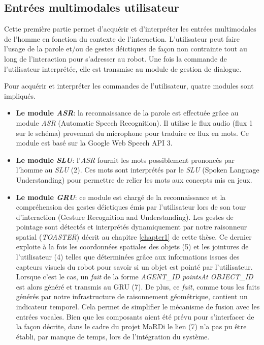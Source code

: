 \documentclass[a4paper,11pt,twoside]{StyleThese}
\begin{document}
\subsection{Entrées multimodales utilisateur}
\label{sec:entréesDial}
Cette première partie permet d'acquérir et d'interpréter les entrées multimodales de l'homme en fonction du contexte de l'interaction. L’utilisateur peut faire l’usage de la parole et/ou de gestes déictiques de façon non contrainte tout au long de l’interaction pour s’adresser au robot. Une fois la commande de l'utilisateur interprétée, elle est transmise au module de gestion de dialogue. 

Pour acquérir et interpréter les commandes de l'utilisateur, quatre modules sont impliqués.

\begin{itemize}
\item \textbf{Le module \textit{ASR}}: la reconnaissance de la parole est effectuée grâce au module \textit{ASR} (Automatic Speech Recognition). Il utilise le flux audio (flux 1 sur le schéma) provenant du microphone pour traduire ce flux en mots. Ce module est basé sur la Google Web Speech API 3.

\item \textbf{Le module \textit{SLU}}: l'\textit{ASR} fournit les mots possiblement prononcés par l'homme au \textit{SLU} (2). Ces mots sont interprétés par le \textit{SLU} (Spoken Language Understanding) pour permettre de relier les mots aux concepts mis en jeux.

\item \textbf{Le module \textit{GRU}}: ce module est chargé de la reconnaissance et la compréhension des gestes déictiques émis par l’utilisateur lors de son tour d’interaction (Gesture Recognition and Understanding). Les gestes de pointage sont détectés et interprétés dynamiquement par notre raisonneur spatial (\textit{TOASTER}) décrit au chapitre \ref{chapter1} de cette thèse. Ce dernier exploite à la fois les coordonnées spatiales des objets (5) et les jointures de l’utilisateur (4) telles que déterminées grâce aux informations issues des capteurs visuels du robot pour savoir si un objet est pointé par l’utilisateur. Lorsque c’est le cas, un \textit{fait} de la forme \textit{AGENT\_ID pointsAt
OBJECT\_ID} est alors généré et transmis au GRU (7). De plus, ce \textit{fait}, comme tous les faits générés par notre infrastructure de raisonnement géométrique, contient un indicateur temporel. Cela permet de simplifier le mécanisme de
fusion avec les entrées vocales.
Bien que les composants aient été prévu pour s'interfacer de la façon décrite, dans le cadre du projet MaRDi le lien (7) n'a pas pu être établi, par manque de temps, lors de l'intégration du système.


\end{itemize}
\end{document}
